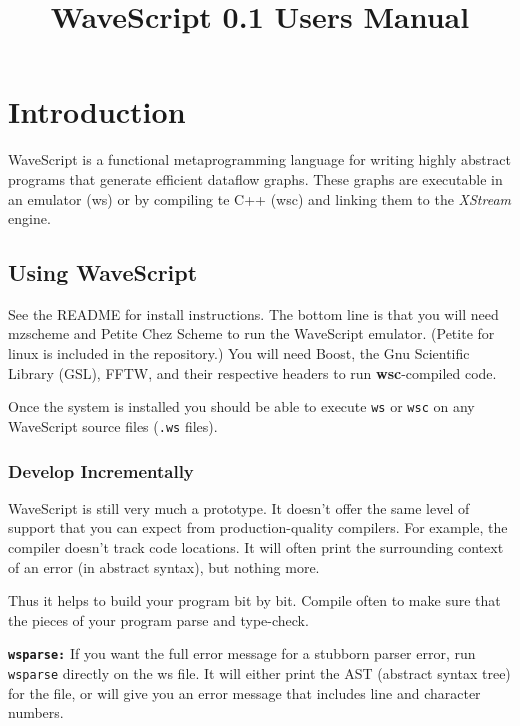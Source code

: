 \documentclass[twocolumn]{report}
\title{WaveScript 0.1 Users Manual}
\begin{document}
\maketitle


\tableofcontents
\clearpage

\chapter{Introduction}

WaveScript is a functional metaprogramming language for writing highly abstract
programs that generate efficient dataflow graphs.  These graphs are
executable in an emulator (ws) or by compiling te C++ (wsc) and linking them
to the {\em XStream} engine.

\section{Using WaveScript}

See the README for install instructions.  The bottom line is that you
will need mzscheme and Petite Chez Scheme to run the WaveScript
emulator.  (Petite for linux is included in the repository.)  You will
need Boost, the Gnu Scientific Library (GSL), FFTW, and their
respective headers to run {\bf wsc}-compiled code.

Once the system is installed you should be able to execute {\tt ws} or
{\tt wsc} on any WaveScript source files ({\tt .ws} files).

\subsection*{Develop Incrementally}

WaveScript is still very much a prototype.  It doesn't offer the same
level of support that you can expect from production-quality
compilers.  For example, the compiler doesn't track code locations.
It will often print the surrounding context of an error (in abstract
syntax), but nothing more.

Thus it helps to build your program bit by bit.  Compile often to make
sure that the pieces of your program parse and type-check.

{\tt \bf wsparse:}
If you want the full error message for a stubborn parser error, run
{\tt wsparse} directly on the ws file.  It will either print the AST
(abstract syntax tree) for the file, or will give you an error message
that includes line and character numbers.
\end{document}

